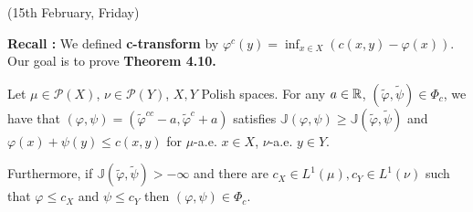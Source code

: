 \documentclass[12pt,a4paper]{article}
\begin{document}
(15th February, Friday)
\s

\textbf{Recall :} We defined \textbf{c-transform} by $\varphi^c(y) = \inf_{x\in X} (c(x,y) - \varphi(x))$. Our goal is to prove \textbf{Theorem 4.10.}
\s

 Let $\mu \in \mathscr{P}(X)$, $\nu \in \mathscr{P}(Y)$, $X, Y$ Polish spaces. For any $a\in \mathbb{R}$, $(\tilde{\varphi}, \tilde{\psi}) \in \Phi_c$, we have that $(\varphi, \psi) = (\tilde{\varphi}^{cc} - a, \tilde{\varphi}^c + a)$ satisfies $\mathbb{J}(\varphi, \psi) \geq \mathbb{J}(\tilde{\varphi}, \tilde{\psi})$ and $\varphi(x) + \psi(y) \leq c(x,y)$ for $\mu$-a.e. $x\in X$, $\nu$-a.e. $y\in Y$.

\quad Furthermore, if $\mathbb{J}(\tilde{\varphi}, \tilde{\psi}) > -\infty$ and there are $c_X\in L^1(\mu), c_Y \in L^1(\nu)$ such that $\varphi \leq c_X$ and $\psi \leq c_Y$ then $(\varphi, \psi) \in \Phi_c$.
\end{document}
